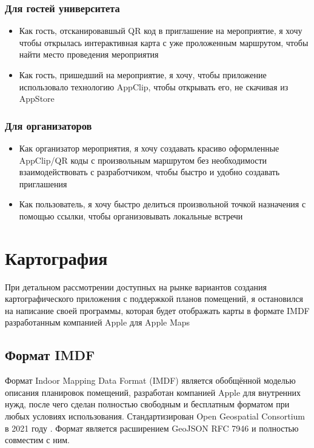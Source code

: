     \subsection{Для гостей университета}
      \begin{itemize}
        \item Как гость, отсканировавшый QR код в приглашение на мероприятие, я хочу чтобы открылась интерактивная карта с уже проложенным маршрутом, чтобы найти место проведения мероприятия
        \item Как гость, пришедший на мероприятие, я хочу, чтобы приложение использовало технологию AppClip, чтобы открывать его, не скачивая из AppStore
      \end{itemize}
    \subsection{Для организаторов}
      \begin{itemize}
        \item Как организатор мероприятия, я хочу создавать красиво оформленные AppClip/QR коды с произвольным маршрутом без необходимости взаимодействовать с разработчиком, чтобы быстро и удобно создавать приглашения
        \item Как пользователь, я хочу быстро делиться произвольной точкой назначения с помощью ссылки, чтобы организовывать локальные встречи
      \end{itemize}

\chapter{Картография}
  При детальном рассмотрении доступных на рынке вариантов создания картографического приложения с поддержкой планов помещений, я остановился на написание своей программы, которая будет отображать карты в формате IMDF разработанным компанией Apple для Apple Maps
  \section{Формат IMDF}
    Формат Indoor Mapping Data Format (IMDF) \cite{IMDF} является обобщённой моделью описания планировок помещений, разработан компанией Apple для внутренних нужд, после чего сделан полностью свободным и бесплатным форматом при любых условиях использования. Стандартизирован Open Geospatial Consortium в 2021 году \cite{IMDFOGC}. Формат является расширением GeoJSON RFC 7946 \cite{GeoJSON-RFC-7946} и полностью совместим с ним.


